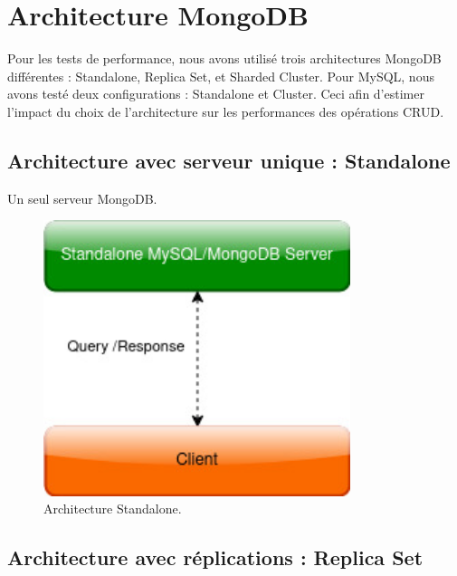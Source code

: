 \documentclass[12pt,a4paper]{report}
\begin{document}
\section{Architecture MongoDB}

Pour les tests de performance, nous avons utilisé trois architectures MongoDB différentes : Standalone, Replica Set, et Sharded Cluster.
Pour MySQL, nous avons testé deux configurations : Standalone et Cluster. 
Ceci afin d'estimer l'impact du choix de l'architecture sur les performances des opérations CRUD.

    \subsection{Architecture avec serveur unique : Standalone}

        Un seul serveur MongoDB.
        
        \begin{figure}[H]
            \centering
            \includegraphics[width=0.8\textwidth]{architectures/Standalone.jpg}
            \caption{Architecture Standalone.}
            \label{fig:standalone}
        \end{figure}

    \subsection{Architecture avec réplications : Replica Set}
\end{document}
